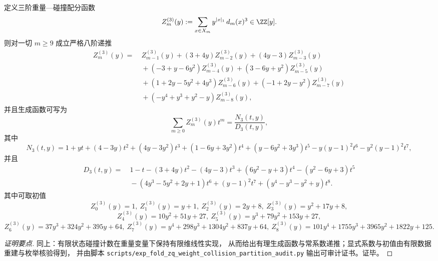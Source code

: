\begin{conclusion}[\texorpdfstring{$(q=3)$}{(q=3)} 的重量—碰撞配分函数：八阶常系数递推与有理生成函数]\label{con:xi-terminal-zm3-order8-rational}
定义三阶重量—碰撞配分函数
\[
Z_m^{(3)}(y):=\sum_{x\in X_m} y^{|x|_1}\,d_m(x)^3\in\ZZ[y].
\]
则对一切 \(m\ge 9\) 成立严格八阶递推
\[
\begin{aligned}
Z_m^{(3)}(y)=&\ Z_{m-1}^{(3)}(y)+(3+4y)Z_{m-2}^{(3)}(y)+(4y-3)Z_{m-3}^{(3)}(y)\\
&\ +(-3+y-6y^2)Z_{m-4}^{(3)}(y)+(3-6y+y^2)Z_{m-5}^{(3)}(y)\\
&\ +(1+2y-5y^2+4y^3)Z_{m-6}^{(3)}(y)+(-1+2y-y^2)Z_{m-7}^{(3)}(y)\\
&\ +(-y^4+y^3+y^2-y)Z_{m-8}^{(3)}(y),
\end{aligned}
\]
并且生成函数可写为
\[
\sum_{m\ge 0} Z_m^{(3)}(y)t^m=\frac{N_3(t,y)}{D_3(t,y)},
\]
其中
\[
N_3(t,y)=1+yt+(4-3y)t^2+(4y-3y^2)t^3+(1-6y+3y^2)t^4+(y-6y^2+3y^3)t^5-y(y-1)^2t^6-y^2(y-1)^2t^7,
\]
并且
\[
\begin{aligned}
D_3(t,y)=&\ 1-t-(3+4y)t^2-(4y-3)t^3+(6y^2-y+3)t^4-(y^2-6y+3)t^5\\
&\ -(4y^3-5y^2+2y+1)t^6+(y-1)^2t^7+(y^4-y^3-y^2+y)t^8.
\end{aligned}
\]
其中可取初值
\[
Z_0^{(3)}(y)=1,\ 
Z_1^{(3)}(y)=y+1,\ 
Z_2^{(3)}(y)=2y+8,\ 
Z_3^{(3)}(y)=y^2+17y+8,
\]
\[
Z_4^{(3)}(y)=10y^2+51y+27,\ 
Z_5^{(3)}(y)=y^3+79y^2+153y+27,
\]
\[
Z_6^{(3)}(y)=37y^3+324y^2+395y+64,\ 
Z_7^{(3)}(y)=y^4+298y^3+1304y^2+837y+64,\ 
Z_8^{(3)}(y)=101y^4+1755y^3+3965y^2+1822y+125.
\]
\end{conclusion}
\begin{proof}[证明要点]
同上：有限状态碰撞计数在重量变量下保持有限维线性实现，
从而给出有理生成函数与常系数递推；显式系数与初值由有限数据重建与枚举核验得到，
并由脚本 \texttt{scripts/exp\_fold\_zq\_weight\_collision\_partition\_audit.py} 输出可审计证书。证毕。
\end{proof}

